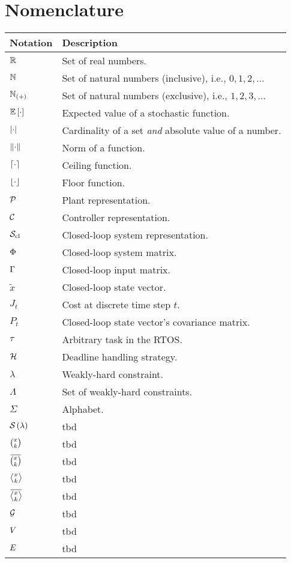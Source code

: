 \chapter*{Nomenclature}%
%
\vspace{-1.75cm}

\begin{table*}[h]
    \centering
    \begin{tabular}{l|l}%
        \textbf{Notation} & \textbf{Description} \\\hline
        $\mathbb{R}$ & Set of real numbers. \\
        $\mathbb{N}_{}$ & Set of natural numbers (inclusive), i.e., $0, 1, 2, \ldots$ \\
        $\mathbb{N}_{\left( + \right)}$ & Set of natural numbers (exclusive), i.e., $1, 2, 3, \ldots$ \\
        $\mathbb{E}\left[ \cdot \right]$ & Expected value of a stochastic function. \\
        $\left|\cdot\right|$ & Cardinality of a set \emph{and} absolute value of a number. \\
        $\lVert\cdot\rVert$ & Norm of a function. \\
        $\lceil\cdot\rceil$ & Ceiling function. \\
        $\lfloor\cdot\rfloor$ & Floor function. \\
        $\mathcal{P}$ & Plant representation. \\
        $\mathcal{C}$ & Controller representation. \\
        $\mathcal{S}_{\text{cl}}$ & Closed-loop system representation. \\
        $\Phi$ & Closed-loop system matrix. \\
        $\Gamma$ & Closed-loop input matrix. \\
        $\tilde x$ & Closed-loop state vector. \\
        $J_t$ & Cost at discrete time step $t$. \\
        $P_t$ & Closed-loop state vector's covariance matrix. \\
        $\tau$ & Arbitrary task in the RTOS. \\
        $\mathcal{H}$ & Deadline handling strategy. \\
        $\lambda$ & Weakly-hard constraint. \\
        $\Lambda$ & Set of weakly-hard constraints. \\
        $\Sigma$ & Alphabet. \\
        $\mathcal{S}_{}\left( \lambda \right)$ & tbd \\
        $\binom{x_{}}{k_{}}$ & tbd \\
        $\anymiss{}$ & tbd \\
        $\rowhit{}$ & tbd \\
        $\rowmiss{}$ & tbd \\
        $\mathcal{G}_{}$ & tbd \\
        $V_{}$ & tbd \\
        $E_{}$ & tbd \\
    \end{tabular}
\end{table*}

